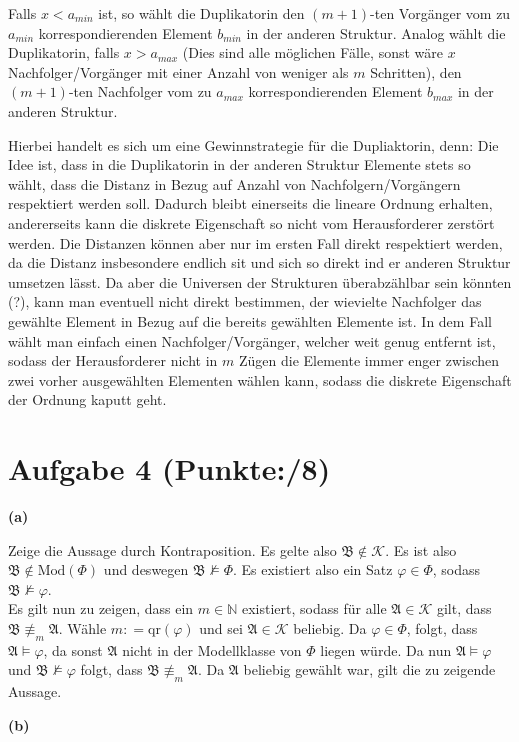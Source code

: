 \documentclass[11pt, a4paper]{article}
\newcommand{\ppp}{8}
\newcommand{\defgr}{\mathrel{\mathop:\!\!=}}
\newcommand{\struc}[1]{\ensuremath{\mathfrak{#1}}}
\begin{document}
\begin{adjustwidth}{20pt}{20pt}
\begin{adjustwidth}{2em}{0em}
\begin{itemize}
Falls $x < a_{min}$ ist, so wählt die Duplikatorin den $(m+1)$-ten Vorgänger vom zu $a_{min}$ korrespondierenden Element $b_{min}$ in der anderen Struktur. Analog wählt die
Duplikatorin, falls $x > a_{max}$ (Dies sind alle möglichen Fälle, sonst wäre $x$ Nachfolger/Vorgänger mit einer Anzahl von weniger als $m$ Schritten),  den $(m+1)$-ten Nachfolger vom zu
$a_{max}$ korrespondierenden Element $b_{max}$ in der anderen Struktur.
\end{itemize}
Hierbei handelt es sich um eine Gewinnstrategie für die Dupliaktorin, denn: Die Idee ist, dass in die Duplikatorin in der anderen Struktur Elemente stets so wählt, dass die Distanz in Bezug auf
Anzahl von Nachfolgern/Vorgängern respektiert werden soll. Dadurch bleibt einerseits die lineare Ordnung erhalten, andererseits kann die diskrete Eigenschaft so nicht vom Herausforderer
zerstört werden. Die Distanzen können aber nur im ersten Fall direkt respektiert werden, da die Distanz insbesondere endlich sit und sich so direkt ind er anderen Struktur umsetzen lässt.
Da aber die Universen der Strukturen überabzählbar sein könnten (?), kann man eventuell nicht direkt bestimmen, der wievielte Nachfolger das gewählte Element in Bezug auf die bereits
gewählten Elemente ist. In dem Fall wählt man einfach einen Nachfolger/Vorgänger, welcher weit genug entfernt ist, sodass der Herausforderer nicht in $m$ Zügen die Elemente immer
enger zwischen zwei vorher ausgewählten Elementen wählen kann, sodass die diskrete Eigenschaft der Ordnung kaputt geht.
\end{adjustwidth}
\end{adjustwidth}

\section*{Aufgabe 4 (Punkte:\qquad/\ppp)}
\textbf{(a)}
\begin{adjustwidth}{20pt}{20pt}
	Zeige die Aussage durch Kontraposition. Es gelte also $\struc{B} \notin \mathcal{K}$. Es ist also $\struc{B} \notin \text{Mod}(\Phi)$ und deswegen $\struc{B} \not\models \Phi$.
	Es existiert also ein Satz $\varphi \in \Phi$, sodass $\struc{B} \not\models \varphi$.\\ %
	Es gilt nun zu zeigen, dass ein $m \in \mathbb{N}$ existiert, sodass für alle $\struc{A} \in \mathcal{K}$ gilt,  dass $\struc{B} \not\equiv_m \struc{A}$. Wähle
	$m \defgr \text{qr}(\varphi)$ und sei $\struc{A} \in \mathcal{K}$ beliebig. Da $\varphi \in \Phi$, folgt, dass $\struc{A} \models \varphi$, da sonst $\struc{A}$ nicht in der
	Modellklasse von $\Phi$ liegen würde. Da nun $\struc{A} \models \varphi$ und $\struc{B} \not\models \varphi$ folgt, dass $\struc{B} \not\equiv_m \struc{A}$. Da $\struc{A}$
	beliebig gewählt war, gilt die zu zeigende Aussage.
\end{adjustwidth}
\textbf{(b)}
\begin{adjustwidth}{20pt}{20pt}
	
\end{adjustwidth}
\end{document}
